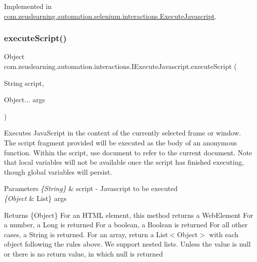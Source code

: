 Implemented in \hyperlink{classcom_1_1zeuslearning_1_1automation_1_1selenium_1_1interactions_1_1ExecuteJavascript_a5495b96ea1c285d54c93c10d09348c14}{com.\+zeuslearning.\+automation.\+selenium.\+interactions.\+Execute\+Javascript}.

\hypertarget{interfacecom_1_1zeuslearning_1_1automation_1_1interactions_1_1IExecuteJavascript_a2460e236de6afd1c685b77700474b901}{}\label{interfacecom_1_1zeuslearning_1_1automation_1_1interactions_1_1IExecuteJavascript_a2460e236de6afd1c685b77700474b901} 
\subsubsection{\texorpdfstring{execute\+Script()}{executeScript()}}
{\footnotesize\ttfamily Object com.\+zeuslearning.\+automation.\+interactions.\+I\+Execute\+Javascript.\+execute\+Script (\begin{DoxyParamCaption}\item[{String}]{script,  }\item[{Object...}]{args }\end{DoxyParamCaption})}

Executes Java\+Script in the context of the currently selected frame or window. The script fragment provided will be executed as the body of an anonymous function. Within the script, use document to refer to the current document. Note that local variables will not be available once the script has finished executing, though global variables will persist.


\begin{DoxyParams}{Parameters}
{\em \{\+String\}} & script -\/ Javascript to be executed \\
\hline
{\em \{\+Object} & List\} args \\
\hline
\end{DoxyParams}
\begin{DoxyReturn}{Returns}
\{Object\} For an H\+T\+ML element, this method returns a Web\+Element For a number, a Long is returned For a boolean, a Boolean is returned For all other cases, a String is returned. For an array, return a List$<$\+Object$>$ with each object following the rules above. We support nested lists. Unless the value is null or there is no return value, in which null is returned 
\end{DoxyReturn}


